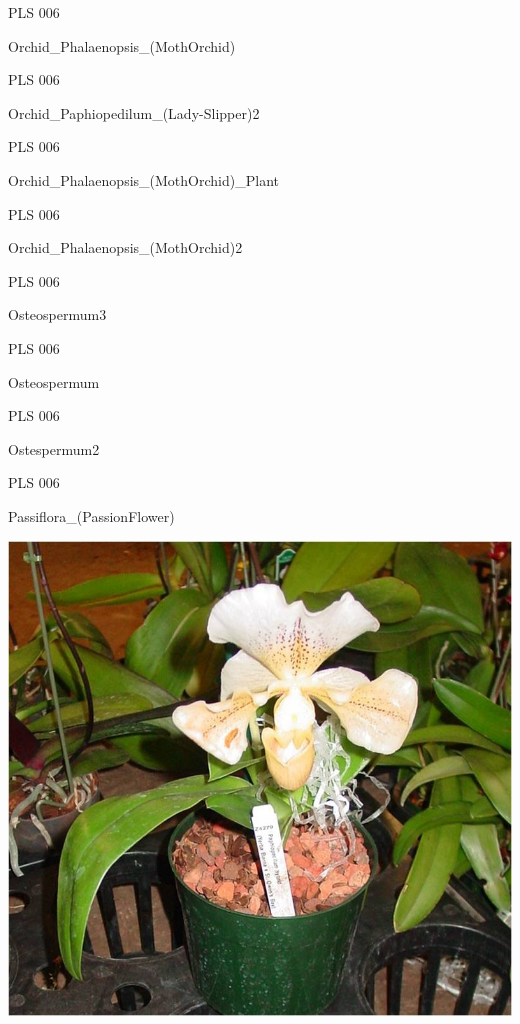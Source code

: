 \documentclass{article}
\begin{document}
\noindent  PLS 006
\vfill
\centerline{{\huge Orchid\_Phalaenopsis\_(MothOrchid) }}
\vfill
\newpage

\noindent  PLS 006
\vfill
\centerline{{\huge Orchid\_Paphiopedilum\_(Lady-Slipper)2 }}
\vfill
\newpage

\noindent  PLS 006
\vfill
\centerline{{\huge Orchid\_Phalaenopsis\_(MothOrchid)\_Plant }}
\vfill
\newpage

\noindent  PLS 006
\vfill
\centerline{{\huge Orchid\_Phalaenopsis\_(MothOrchid)2 }}
\vfill
\newpage

\noindent  PLS 006
\vfill
\centerline{{\huge Osteospermum3 }}
\vfill
\newpage

\noindent  PLS 006
\vfill
\centerline{{\huge Osteospermum }}
\vfill
\newpage

\noindent  PLS 006
\vfill
\centerline{{\huge Ostespermum2 }}
\vfill
\newpage

\noindent  PLS 006
\vfill
\centerline{{\huge Passiflora\_(PassionFlower) }}
\vfill
\newpage

\begin{center}
\includegraphics[height=0.925\paperheight]{../Orchid_Paphiopedilum_(Lady-Slipper)2.jpg}
\end{center}
\newpage
\end{document}
